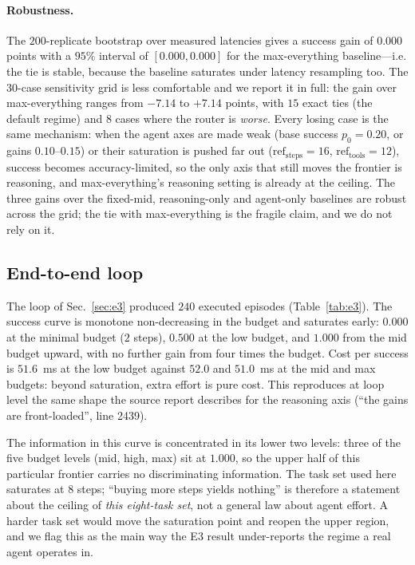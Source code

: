 \documentclass[10pt]{article} %
\begin{document}
\paragraph{Robustness.}
The $200$-replicate bootstrap over measured latencies gives a success gain of
$0.000$ points with a $95\%$ interval of $[0.000, 0.000]$ for the
max-everything baseline---i.e. the tie is stable, because the baseline saturates
under latency resampling too. The $30$-case sensitivity grid is less
comfortable and we report it in full: the gain over max-everything ranges from
$-7.14$ to $+7.14$ points, with $15$ exact ties (the default regime) and $8$
cases where the router is \emph{worse}. Every losing case is the same mechanism:
when the agent axes are made weak (base success $p_0{=}0.20$, or gains
$0.10$--$0.15$) or their saturation is pushed far out
($\mathrm{ref}_{\mathrm{steps}}{=}16$, $\mathrm{ref}_{\mathrm{tools}}{=}12$),
success becomes accuracy-limited, so the only axis that still moves the frontier
is reasoning, and max-everything's reasoning setting is already at the ceiling.
The three gains over the fixed-mid, reasoning-only and agent-only baselines are
robust across the grid; the tie with max-everything is the fragile claim, and we
do not rely on it.

\subsection{End-to-end loop}
\label{sec:res-e3}

The loop of Sec.~\ref{sec:e3} produced $240$ executed episodes (Table~\ref{tab:e3}). The success curve is
monotone non-decreasing in the budget and saturates early: $0.000$ at the
minimal budget ($2$ steps), $0.500$ at the low budget, and $1.000$ from the mid
budget upward, with no further gain from four times the budget. Cost per success
is $51.6$~ms at the low budget against $52.0$ and $51.0$~ms at the mid and max
budgets: beyond saturation, extra effort is pure cost. This reproduces at loop
level the same shape the source report describes for the reasoning axis
(``the gains are front-loaded'', line 2439).

The information in this curve is concentrated in its lower two levels: three of
the five budget levels (mid, high, max) sit at $1.000$, so the upper half of this
particular frontier carries no discriminating information. The task set used here
saturates at $8$ steps; ``buying more steps yields nothing'' is therefore a
statement about the ceiling of \emph{this eight-task set}, not a general law about
agent effort. A harder task set would move the saturation point and reopen the
upper region, and we flag this as the main way the E3 result under-reports the
regime a real agent operates in.
\end{document}
